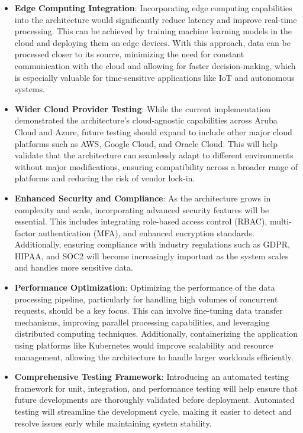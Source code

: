 \begin{itemize}
    \item \textbf{Edge Computing Integration}: Incorporating edge computing capabilities into the architecture would significantly reduce latency and improve real-time processing. This can be achieved by training machine learning models in the cloud and deploying them on edge devices. With this approach, data can be processed closer to its source, minimizing the need for constant communication with the cloud and allowing for faster decision-making, which is especially valuable for time-sensitive applications like IoT and autonomous systems.
    
    \item \textbf{Wider Cloud Provider Testing}: While the current implementation demonstrated the architecture’s cloud-agnostic capabilities across Aruba Cloud and Azure, future testing should expand to include other major cloud platforms such as AWS, Google Cloud, and Oracle Cloud. This will help validate that the architecture can seamlessly adapt to different environments without major modifications, ensuring compatibility across a broader range of platforms and reducing the risk of vendor lock-in.

    \item \textbf{Enhanced Security and Compliance}: As the architecture grows in complexity and scale, incorporating advanced security features will be essential. This includes integrating role-based access control (RBAC), multi-factor authentication (MFA), and enhanced encryption standards. Additionally, ensuring compliance with industry regulations such as GDPR, HIPAA, and SOC2 will become increasingly important as the system scales and handles more sensitive data.

    \item \textbf{Performance Optimization}: Optimizing the performance of the data processing pipeline, particularly for handling high volumes of concurrent requests, should be a key focus. This can involve fine-tuning data transfer mechanisms, improving parallel processing capabilities, and leveraging distributed computing techniques. Additionally, containerizing the application using platforms like Kubernetes would improve scalability and resource management, allowing the architecture to handle larger workloads efficiently.

    \item \textbf{Comprehensive Testing Framework}: Introducing an automated testing framework for unit, integration, and performance testing will help ensure that future developments are thoroughly validated before deployment. Automated testing will streamline the development cycle, making it easier to detect and resolve issues early while maintaining system stability.
\end{itemize}

